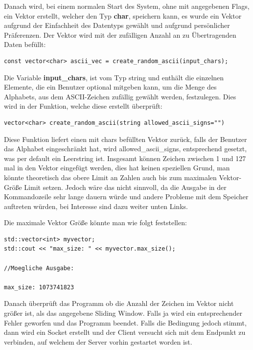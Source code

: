 \documentclass{article}
\begin{document}
Danach wird, bei einem normalen Start des System, ohne mit angegebenen Flags, ein Vektor erstellt, welcher den Typ \textbf{char}, speichern kann, es wurde ein Vektor aufgrund der Einfachheit des Datentyps gewählt und aufgrund persönlicher Präferenzen. Der Vektor wird mit der zufälligen Anzahl an zu Übertragenden Daten befüllt:

\begin{lstlisting}
const vector<char> ascii_vec = create_random_ascii(input_chars);
\end{lstlisting}

Die Variable \textbf{input\_chars}, ist vom Typ string und enthält die einzelnen Elemente, die ein Benutzer optional mitgeben kann, um die Menge des Alphabets, aus dem ASCII-Zeichen zufällig gewählt werden, festzulegen. Dies wird in der Funktion, welche diese erstellt überprüft:

\begin{lstlisting}
vector<char> create_random_ascii(string allowed_ascii_signs="")
\end{lstlisting}

Diese Funktion liefert einen mit chars befüllten Vektor zurück, falls der Benutzer das Alphabet eingeschränkt hat, wird allowed\_ascii\_signs, entsprechend gesetzt, was per default ein Leerstring ist. Insgesamt können Zeichen zwischen 1 und 127 mal in den Vektor eingefügt werden, dies hat keinen speziellen Grund, man könnte theoretisch das obere Limit an Zahlen auch bis zum maximalen Vektor-Größe Limit setzen. Jedoch wäre das nicht sinnvoll, da die Ausgabe in der Kommandozeile sehr lange dauern würde und andere Probleme mit dem Speicher auftreten würden, bei Interesse sind dazu weiter unten Links.
 
Die maximale Vektor Größe könnte man
wie folgt feststellen:
\begin{lstlisting}
std::vector<int> myvector;
std::cout << "max_size: " << myvector.max_size();

//Moegliche Ausgabe:

max_size: 1073741823
\end{lstlisting}

Danach überprüft das Programm ob die Anzahl der Zeichen im Vektor nicht größer ist, als das angegebene Sliding Window. Falls ja wird ein entsprechender Fehler geworfen und das Programm beendet. Falls die Bedingung jedoch stimmt, dann wird ein Socket erstellt
und der Client versucht sich mit dem Endpunkt zu verbinden, auf welchem der Server vorhin gestartet worden ist.
\end{document}
